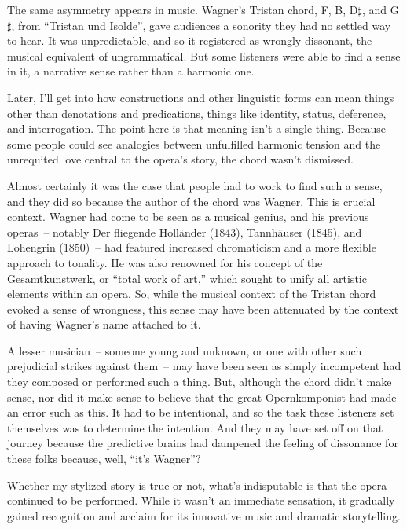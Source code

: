 \bigskip

The same asymmetry appears in music. Wagner's Tristan chord, F, B,
D\(\sharp\), and G\(\sharp\), from \enquote{Tristan und Isolde}, gave
audiences a sonority they had no settled way to hear. It was
unpredictable, and so it registered as wrongly dissonant, the musical
equivalent of ungrammatical. But some listeners were able to find a
sense in it, a narrative sense rather than a harmonic one.

Later, I'll get into how constructions and other linguistic forms can
mean things other than denotations and predications, things like
identity, status, deference, and interrogation. The point here is that
meaning isn't a single thing. Because some people could see analogies
between unfulfilled harmonic tension and the unrequited love central to
the opera's story, the chord wasn't dismissed.

Almost certainly it was the case that people had to work to find such a sense, and they did so because the author of the chord was Wagner. This is crucial context. Wagner had come to be seen as a musical genius, and his previous operas~-- notably Der fliegende Holländer (1843), Tannhäuser (1845), and Lohengrin (1850)~-- had featured increased chromaticism and a more flexible approach to tonality. He was also renowned for his concept of the Gesamtkunstwerk, or ``total work of art,'' which sought to unify all artistic elements within an opera. So, while the musical context of the Tristan chord evoked a sense of wrongness, this sense may have been attenuated by the context of having Wagner's name attached to it.

A lesser musician~-- someone young and unknown, or one with other such prejudicial strikes against them~-- may have been seen as simply incompetent had they composed or performed such a thing. But, although the chord didn't make sense, nor did it make sense to believe that the great Opernkomponist had made an error such as this. It had to be intentional, and so the task these listeners set themselves was to determine the intention. And they may have set off on that journey because the predictive brains had dampened the feeling of dissonance for these folks because, well, ``it's Wagner''?

Whether my stylized story is true or not, what's indisputable is that the opera continued to be performed. While it wasn't an immediate sensation, it gradually gained recognition and acclaim for its innovative music and dramatic storytelling.

